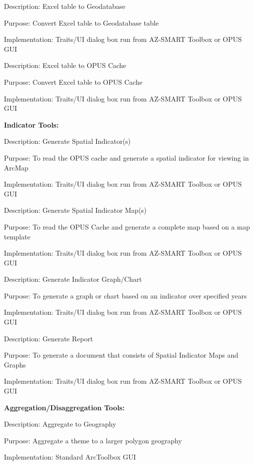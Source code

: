 Description: Excel table to Geodatabase

Purpose: Convert Excel table to Geodatabase table

Implementation: Traits/UI dialog box run from AZ-SMART Toolbox or OPUS GUI

\bigskip

Description: Excel table to OPUS Cache

Purpose: Convert Excel table to OPUS Cache

Implementation: Traits/UI dialog box run from AZ-SMART Toolbox or OPUS GUI

\bigskip

\textbf{Indicator Tools:}

\bigskip

Description: Generate Spatial Indicator(s)

Purpose: To read the OPUS cache and generate a spatial indicator for viewing in ArcMap

Implementation: Traits/UI dialog box run from AZ-SMART Toolbox or OPUS GUI

\bigskip

Description: Generate Spatial Indicator Map(s)

Purpose: To read the OPUS Cache and generate a complete map based on a map template

Implementation: Traits/UI dialog box run from AZ-SMART Toolbox or OPUS GUI

\bigskip

Description: Generate Indicator Graph/Chart

Purpose: To generate a graph or chart based on an indicator over specified years

Implementation: Traits/UI dialog box run from AZ-SMART Toolbox or OPUS GUI

\bigskip

Description: Generate Report

Purpose: To generate a document that consists of Spatial Indicator Maps and Graphs

Implementation: Traits/UI dialog box run from AZ-SMART Toolbox or OPUS GUI

\bigskip

\textbf{Aggregation/Disaggregation Tools:}

\bigskip

Description: Aggregate to Geography

Purpose: Aggregate a theme to a larger polygon geography

Implementation: Standard ArcToolbox GUI

